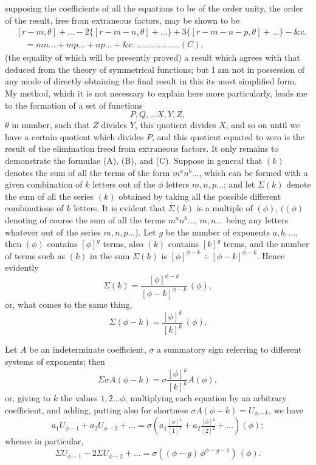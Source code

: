 \documentclass[11pt]{article}
\begin{document}
\newpage
\setcounter{page}{265}

supposing the coefficients of all the equations to be of the order unity, the order of the result, free from extraneous factors, may be shown to be
\begin{align*}
& [r - m, \theta] + \ldots - 2\{[r - m - n, \theta] + \ldots\} + 3\{[r - m - n - p, \theta] + \ldots\} - \&\mathrm{c.}\\
& \quad = mn \ldots + mp \ldots + np \ldots + \&\mathrm{c.}\ \ldots\ldots\ldots\ldots\ldots\ldots (C),
\end{align*}
(the equality of which will be presently proved) a result which agrees with that deduced from the theory of symmetrical functions; but I am not in possession of any mode of directly obtaining the final result in this its most simplified form. My method, which it is not necessary to explain here more particularly, leads me to the formation of a set of functions
\[
P, Q, \ldots X, Y, Z,
\]
$\theta$ in number, such that $Z$ divides $Y$, this quotient divides $X$, and so on until we have a certain quotient which divides $P$, and this quotient equated to zero is the result of the elimination freed from extraneous factors. It only remains to demonstrate the formulae (A), (B), and (C). Suppose in general that $(k)$ denotes the sum of all the terms of the form $m^a n^b \ldots$, which can be formed with a given combination of $k$ letters out of the $\phi$ letters $m, n, p \ldots$; and let $\Sigma (k)$ denote the sum of all the series $(k)$ obtained by taking all the possible different combinations of $k$ letters. It is evident that $\Sigma (k)$ is a multiple of $(\phi)$, $((\phi)$ denoting of course the sum of all the terms $m^a n^b \ldots$, $m, n \ldots$ being any letters whatever out of the series $m, n, p \ldots$). Let $g$ be the number of exponents $a, b, \ldots$, then $(\phi)$ contains $[\phi]^g$ terms, also $(k)$ contains $[k]^g$ terms, and the number of terms such as $(k)$ in the sum $\Sigma (k)$ is $[\phi]^{\phi - k} \div [\phi - k]^{\phi - k}$. Hence evidently
\[
\Sigma(k) = \frac{[\phi]^{\phi - k}}{[\phi - k]^{\phi - k}}\,(\phi),
\]
or, what comes to the same thing,
\[
\Sigma(\phi - k) = \frac{[\phi]^{k}}{[k]^{k}}\,(\phi).
\]

Let $A$ be an indeterminate coefficient, $\sigma$ a summatory sign referring to different systems of exponents; then
\[
\Sigma \sigma A(\phi - k) = \sigma \frac{[\phi]^k}{[k]^k} A(\phi),
\]
or, giving to $k$ the values $1, 2 \ldots \phi$, multiplying each equation by an arbitrary coefficient, and adding, putting also for shortness $\sigma A(\phi - k) = U_{\phi - k}$, we have
\[
a_1 U_{\phi - 1} + a_2 U_{\phi - 2} + \ldots = \sigma\left( a_1 \tfrac{[\phi]^1}{[1]^1} + a_2 \tfrac{[\phi]^2}{[2]^2} + \ldots\right)(\phi);
\]
whence in particular,
\[
\Sigma U_{\phi - 1} - 2\Sigma U_{\phi - 2} + \ldots = \sigma ((\phi - g)\,\phi^{\phi - g - 1})\,(\phi).
\]
\end{document}
